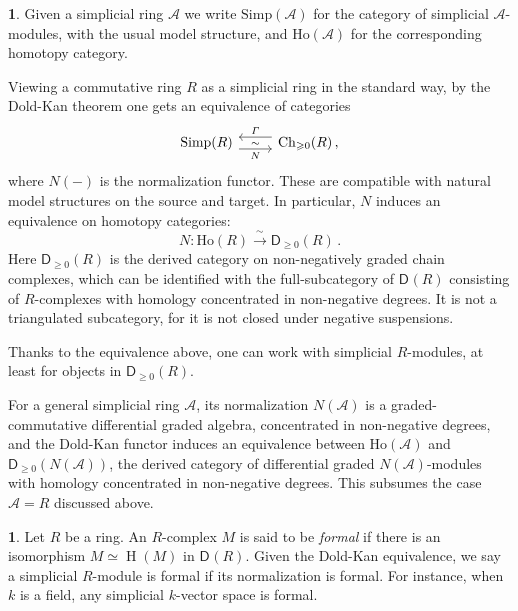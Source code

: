 \documentclass{amsart}
\newcommand{\dcat}[2][]{\cat{D}_{#1}(#2)}
\newcommand{\cat}[1]{{\mathsf{#1}}}
\newcommand{\hh}{\operatorname{H}}
\theoremstyle{definition}
\newtheorem{chunk}[subsection]{}
\theoremstyle{remark}
\numberwithin{equation}{subsection}
\begin{document}
\begin{chunk}
\label{ch:dold-kan}
Given a simplicial ring $\mathcal A$ we write $\mathrm{Simp}(\mathcal A)$ for the category of simplicial $\mathcal A$-modules, with the usual model structure, and $\mathrm{Ho}(\mathcal A)$ for the corresponding homotopy category.

Viewing a commutative ring $R$ as a simplicial ring in the standard way, by the Dold-Kan theorem one gets an equivalence of categories
\[
 \begin{tikzcd}
 \mathrm{Simp}(R) \ar[r, shift right=1ex, "N" swap, "\sim"] 
 & \mathrm{Ch}_{\geqslant 0}(R)\,, \ar[l, shift right = 1ex, "\varGamma" swap]
 \end{tikzcd}
\]
where $N(-)$ is the normalization functor. These are compatible with natural model structures on the source and target. In particular, $N$ induces an equivalence on homotopy categories:
\[
N\colon \mathrm{Ho}(R) \xrightarrow{\ \sim\ } \cat{D}_{\geqslant 0}(R)\,.
\]
Here $\cat{D}_{\geqslant 0}(R)$ is the derived category on non-negatively graded chain complexes, which can be identified with the full-subcategory of $\dcat R$ consisting of $R$-complexes with homology concentrated in non-negative degrees. It is not a triangulated subcategory, for it is not closed under negative suspensions.

Thanks to the equivalence above, one can work with simplicial $R$-modules, at least for objects in $\cat{D}_{\geqslant 0}(R)$.

For a general simplicial ring $\mathcal A$, its normalization $N(\mathcal A)$ is a graded-commutative differential graded algebra, concentrated in non-negative degrees, and the Dold-Kan functor induces an equivalence between $\mathrm{Ho}({\mathcal A})$ and $\cat{D}_{\geqslant 0}(N(\mathcal A))$, the derived category of differential graded $N(\mathcal A)$-modules with homology concentrated in non-negative degrees. This subsumes the case $\mathcal A=R$ discussed above.
\end{chunk}

\begin{chunk}
\label{ch:formality}
Let $R$ be a ring. An $R$-complex $M$ is said to be \emph{formal} if there is an isomorphism $M\simeq \hh(M)$ in $\dcat R$. Given the Dold-Kan equivalence, we say a simplicial $R$-module is formal if its normalization is formal. For instance, when $k$ is a field, any simplicial $k$-vector space is formal.
\end{chunk}
\end{document}
